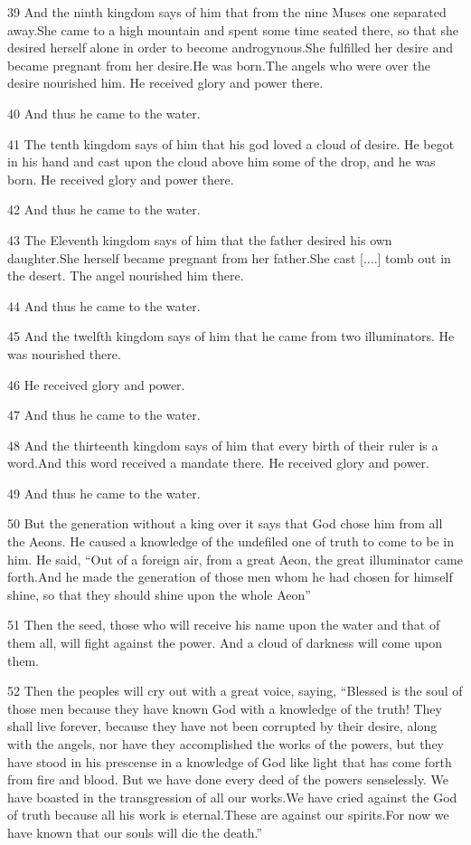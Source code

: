 \par 39 And the ninth kingdom says of him that from the nine Muses one separated away.She came to a high mountain and spent some time seated there, so that she desired herself alone in order to become androgynous.She fulfilled her desire and became pregnant from her desire.He was born.The angels who were over the desire nourished him. He received glory and power there.
\par 40 And thus he came to the water.
\par 41 The tenth kingdom says of him that his god loved a cloud of desire. He begot in his hand and cast upon the cloud above him some of the drop, and he was born. He received glory and power there.
\par 42 And thus he came to the water.
\par 43 The Eleventh kingdom says of him that the father desired his own daughter.She herself became pregnant from her father.She cast [....] tomb out in the desert. The angel nourished him there.
\par 44 And thus he came to the water.

\par 45 And the twelfth kingdom says of him that he came from two illuminators. He was nourished there.
\par 46 He received glory and power.
\par 47 And thus he came to the water.

\par 48 And the thirteenth kingdom says of him that every birth of their ruler is a word.And this word received a mandate there. He received glory and power.
\par 49 And thus he came to the water.
\par 50 But the generation without a king over it says that God chose him from all the Aeons. He caused a knowledge of the undefiled one of truth to come to be in him. He said, “Out of a foreign air, from a great Aeon, the great illuminator came forth.And he made the generation of those men whom he had chosen for himself shine, so that they should shine upon the whole Aeon”

\par 51 Then the seed, those who will receive his name upon the water and that of them all, will fight against the power. And a cloud of darkness will come upon them.

\par 52 Then the peoples will cry out with a great voice, saying, “Blessed is the soul of those men because they have known God with a knowledge of the truth! They shall live forever, because they have not been corrupted by their desire, along with the angels, nor have they accomplished the works of the powers, but they have stood in his prescense in a knowledge of God like light that has come forth from fire and blood. But we have done every deed of the powers senselessly. We have boasted in the transgression of all our works.We have cried against the God of truth because all his work is eternal.These are against our spirits.For now we have known that our souls will die the death.”

